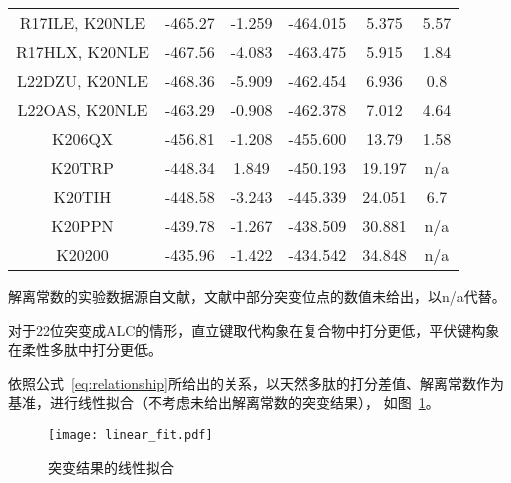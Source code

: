 \begin{table}
\begin{threeparttable}[c]
\begin{tabular}{cccccc}
      R17ILE, K20NLE          & -465.27               & -1.259             & -464.015          & 5.375                   & 5.57                     \\         
      R17HLX, K20NLE          & -467.56               & -4.083             & -463.475          & 5.915                   & 1.84                     \\         
      L22DZU, K20NLE          & -468.36               & -5.909             & -462.454          & 6.936                   & 0.8                      \\        
      L22OAS, K20NLE          & -463.29               & -0.908             & -462.378          & 7.012                   & 4.64                     \\         
      K206QX                  & -456.81               & -1.208             & -455.600          & 13.79                   & 1.58                     \\          
      K20TRP                  & -448.34               & 1.849              & -450.193          & 19.197                  & n/a                      \\         
      K20TIH                  & -448.58               & -3.243             & -445.339          & 24.051                  & 6.7                      \\          
      K20PPN                  & -439.78               & -1.267             & -438.509          & 30.881                  & n/a                      \\          
      K20200                  & -435.96               & -1.422             & -434.542          & 34.848                  & n/a                      \\          
      \bottomrule
    \end{tabular}
    \begin{tablenotes}
      \item [①] 解离常数的实验数据源自文献，文献中部分突变位点的数值未给出，以n/a代替。
      \item [②] 对于22位突变成ALC的情形，直立键取代构象在复合物中打分更低，平伏键构象在柔性多肽中打分更低。
    \end{tablenotes}
  \end{threeparttable}
\end{table}
依照公式~\eqref{eq:relationship}所给出的关系，以天然多肽的打分差值、解离常数作为基准，进行线性拟合（不考虑未给出解离常数的突变结果），
如图~\ref{fig:linear_fit}。
\begin{figure}
  \centering
  \texttt{[image: linear\_fit.pdf]}
  \caption{突变结果的线性拟合}
  \label{fig:linear_fit}
\end{figure}

